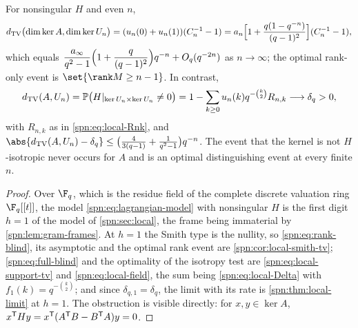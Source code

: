 \begin{corollary}\label{spn:thm:rank-blind}
For nonsingular $H$ and even $n$,
\begin{equation}\label{spn:eq:rank-blind}
 d_{\mathrm{TV}}\bigl(\dim\ker A,\dim\ker U_n\bigr)=(u_n(0)+u_n(1))(C_n^{-1}-1)
 =a_n\Bigl[1+\frac{q(1-q^{-n})}{(q-1)^2}\Bigr](C_n^{-1}-1),
\end{equation}
which equals
$\dfrac{a_\infty}{q^2-1}\Bigl(1+\dfrac{q}{(q-1)^2}\Bigr)q^{-n}+O_q(q^{-2n})$ as $n\to\infty$;
the optimal rank-only event is $\set{\rank M\ge n-1}$. In contrast,
\begin{equation}\label{spn:eq:full-blind}
 d_{\mathrm{TV}}(A,U_n)=\mathbb{P}\bigl(H|_{\ker U_n\times\ker U_n}\ne0\bigr)
 =1-\sum_{k\ge0}u_n(k)q^{-\binom k2}R_{n,k}\longrightarrow\delta_q>0 ,
\end{equation}
with $R_{n,k}$ as in \eqref{spn:eq:local-Rnk}, and
$\abs{\spnTV(A,U_n)-\delta_q}\le\bigl(\tfrac4{3(q-1)}+\tfrac1{q^2-1}\bigr)q^{-n}$. The event that the
kernel is not $H$-isotropic never occurs for $A$ and is an optimal distinguishing event at every
finite $n$.
\end{corollary}

\begin{proof}
Over $\F_q$, which is the residue field of the complete discrete valuation ring $\F_q[[t]]$, the
model \eqref{spn:eq:lagrangian-model} with nonsingular $H$ is the first digit $h=1$ of the model of
\cref{spn:sec:local}, the frame being immaterial by \cref{spn:lem:gram-frames}. At $h=1$ the Smith
type is the nullity, so \eqref{spn:eq:rank-blind}, its asymptotic and the optimal rank event are
\cref{spn:cor:local-smith-tv}; \eqref{spn:eq:full-blind} and the optimality of the isotropy test are
\eqref{spn:eq:local-support-tv} and \eqref{spn:eq:local-field}, the sum being \eqref{spn:eq:local-Delta}
with $f_1(k)=q^{-\binom k2}$; and since $\delta_{q,1}=\delta_q$, the limit with its rate is
\cref{spn:thm:local-limit} at $h=1$. The obstruction is visible directly: for $x,y\in\ker A$,
$x^{\mathsf{T}}Hy=x^{\mathsf{T}}(A^{\mathsf{T}}B-B^{\mathsf{T}}A)y=0$.
\end{proof}

